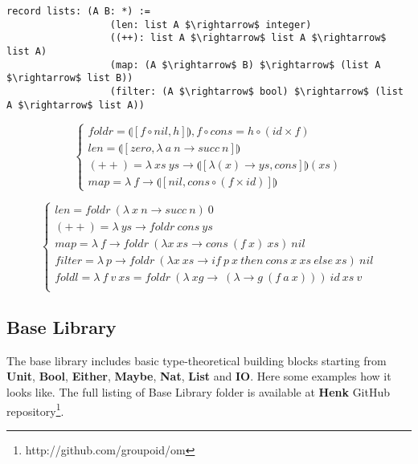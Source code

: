 \documentclass{article}
\begin{document}
\begin{lstlisting}[mathescape=true]
           record lists: (A B: *) :=
                  (len: list A $\rightarrow$ integer)
                  ((++): list A $\rightarrow$ list A $\rightarrow$ list A)
                  (map: (A $\rightarrow$ B) $\rightarrow$ (list A $\rightarrow$ list B))
                  (filter: (A $\rightarrow$ bool) $\rightarrow$ (list A $\rightarrow$ list A))
\end{lstlisting}

$$
\begin{cases}
foldr = \llparenthesis [ f \circ nil , h] \rrparenthesis, f \circ cons = h \circ (id \times f)\\
len = \llparenthesis [ zero, \lambda\ a\ n \rightarrow succ\ n ] \rrparenthesis \\
(++) = \lambda\ xs\ ys \rightarrow \llparenthesis [ \lambda (x) \rightarrow ys, cons ] \rrparenthesis (xs) \\
map = \lambda\ f \rightarrow \llparenthesis [ nil, cons \circ (f \times id)] \rrparenthesis
\end{cases}
$$

$$
\begin{cases}
len = foldr\ (\lambda\ x\ n \rightarrow succ\ n)\ 0\\
(++) = \lambda\ ys \rightarrow foldr\ cons\ ys\\
map = \lambda\ f \rightarrow foldr\ (\lambda x\ xs \rightarrow cons\ (f\ x)\ xs)\ nil\\
filter = \lambda\ p \rightarrow foldr\ (\lambda x\ xs \rightarrow if\ p\ x\ then\ cons\ x\ xs\ else\ xs)\ nil\\
foldl = \lambda\ f\ v\ xs = foldr\ (\lambda\ xg\rightarrow\ (\lambda \rightarrow g\ (f\ a\ x)))\ id\ xs\ v\\
\end{cases}
$$

\subsection{Base Library}
The base library includes basic type-theoretical
building blocks starting from {\bf Unit}, {\bf Bool}, {\bf Either}, {\bf Maybe}, {\bf Nat}, {\bf List} and {\bf IO}.
Here some examples how it looks like. The full listing of Base Library folder
is available at {\bf Henk} GitHub repository\footnote{http://github.com/groupoid/om}.
\end{document}
